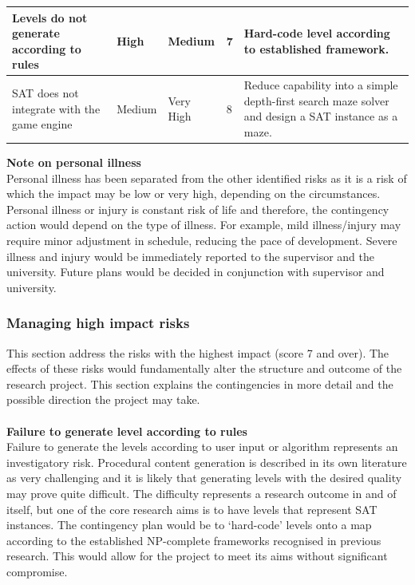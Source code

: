 \documentclass[a4paper]{article}
\begin{document}
\begin{center}
\begin{tabular}{ | p{4.2cm} | l | p{2.1cm} | p{1.1cm} | p{5cm} |}
Levels do not generate according to rules & High & Medium & 7 & Hard-code level according to established framework. \\ \hline 


    SAT does not integrate with the game engine & Medium & Very High & 8 & Reduce capability into a simple depth-first search maze solver and design a SAT instance as a maze.
    \\ \hline




    \hline


    \end{tabular}
    \label{risk}
\end{center}

\noindent \textbf{Note on personal illness} \\

\noindent Personal illness has been separated from the other identified risks as it is a risk of
which the impact may be low or very high, depending on the circumstances. Personal illness or injury
is constant risk of life and therefore, the contingency action would depend on the type of illness.
For example, mild illness/injury may require minor adjustment in schedule, reducing the pace of
development. Severe illness and injury would be immediately reported to the supervisor and the
university. Future plans would be decided in conjunction with supervisor and  university.

\subsubsection{Managing high impact risks}

This section address the risks with the highest impact (score 7 and over). The effects of these
risks would fundamentally alter the structure and outcome of the research project. This section
explains the contingencies in more detail and the possible direction the project may take. \\
\\
\noindent \textbf{Failure to generate level according to rules} \\

\noindent Failure to generate the levels according to user input or algorithm represents an
investigatory risk. Procedural content generation is described in its own literature as very
challenging and it is likely that generating levels with the desired quality may prove quite
difficult. The difficulty represents a research outcome in and of itself, but one of the core
research aims is to have levels that represent SAT instances. The contingency plan would be to
`hard-code' levels onto a map according to the established NP-complete frameworks recognised in
previous research. This would allow for the project to meet its aims without significant compromise.\\
\end{document}
